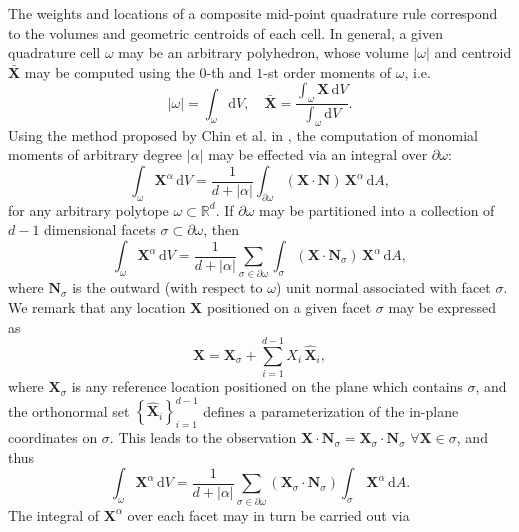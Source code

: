 	The weights and locations of a composite mid-point quadrature rule correspond to the volumes and geometric centroids of each cell. In general, a given quadrature cell $\omega$ may be an arbitrary polyhedron, whose volume $|\omega|$ and centroid $\bar{\bm{X}}$ may be computed using the $0$-th and $1$-st order moments of $\omega$, i.e.
	\begin{equation}
		|\omega| = \int_{\omega} \mathrm dV, \quad \bar{\bm{X}} = \frac{\int_{\omega} \bm{X} \, \mathrm dV}{\int_{\omega} \mathrm dV}.
	\end{equation}
	Using the method proposed by Chin et al. in \cite{Chin:15}, the computation of monomial moments of arbitrary degree $|\alpha|$ may be effected via an integral over $\partial \omega$:
	\begin{equation}
		\int_{\omega} \bm{X}^\alpha \, \mathrm dV = \frac{1}{d+|\alpha|} \int_{\partial \omega} (\bm{X} \cdot \bm{N}) \, \bm{X}^\alpha \, \mathrm dA,
	\end{equation}
	for any arbitrary polytope $\omega \subset \mathbb{R}^d$. If $\partial \omega$ may be partitioned into a collection of $d-1$ dimensional facets $\sigma \subset \partial \omega$, then
	\begin{equation}
		\int_{\omega} \bm{X}^\alpha \, \mathrm dV = \frac{1}{d+|\alpha|} \sum_{\sigma \in \partial \omega} \int_{\sigma} (\bm{X} \cdot \bm{N}_{\sigma}) \, \bm{X}^\alpha \, \mathrm dA,
	\end{equation}
	where $\bm{N}_\sigma$ is the outward (with respect to $\omega$) unit normal associated with facet $\sigma$. We remark that any location $\bm{X}$ positioned on a given facet $\sigma$ may be expressed as
	\begin{equation}
		\bm{X} = \bm{X}_\sigma + \sum_{i=1}^{d-1} X_i \, \hat{\bm{X}}_i,
	\end{equation}
	where $\bm{X}_\sigma$ is any reference location positioned on the plane which contains $\sigma$, and the orthonormal set $\left\{ \hat{\bm{X}}_i \right\}_{i=1}^{d-1}$ defines a parameterization of the in-plane coordinates on $\sigma$. This leads to the observation $\bm{X} \cdot \bm{N}_\sigma = \bm{X}_\sigma \cdot \bm{N}_\sigma \, \, \forall \bm{X} \in \sigma$, and thus
	\begin{equation}
		\int_{\omega} \bm{X}^\alpha \, \mathrm dV = \frac{1}{d+|\alpha|} \sum_{\sigma \in \partial \omega} (\bm{X}_\sigma \cdot \bm{N}_{\sigma}) \int_{\sigma} \, \bm{X}^\alpha \, \mathrm dA.
	\end{equation}
	The integral of $\bm{X}^\alpha$ over each facet may in turn be carried out via
